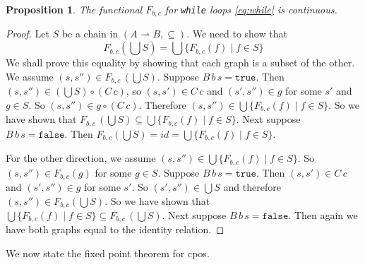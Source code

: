 \documentclass{tufte-handout}
\newcommand{\TRUE}[0]{\mathtt{true}}
\newcommand{\FALSE}[0]{\mathtt{false}}
\newtheorem{proposition}[theorem]{Proposition}
\begin{document}
\begin{proposition}
  The functional $F_{b,c}$ for \texttt{while} loops \eqref{eq:while}
  is continuous.
\end{proposition}
\begin{proof}
  Let $S$ be a chain in $(A\rightharpoonup B,\subseteq)$. 
  We need to show that
  \[
  F_{b,c}(\bigcup S) = \bigcup \{ F_{b,c}(f) \mid f \in S\}
  \]
  We shall prove this equality by showing that each graph is a subset
  of the other.  We assume $(s,s'') \in F_{b,c}\,(\bigcup S)$.
  Suppose $B\,b\,s = \TRUE$.  Then $(s,s'') \in (\bigcup S) \circ (C
  \, c)$, so $(s,s') \in C\,c$ and $(s',s'') \in g$ for some $s'$ and
  $g \in S$. So $(s,s'') \in g \circ (C\, c)$.  Therefore $(s,s'') \in
  \bigcup \{ F_{b,c}(f) \mid f \in S \}$.  So we have shown that
  $F_{b,c}\,(\bigcup S) \subseteq \bigcup \{ F_{b,c}(f) \mid f \in S
  \}$. Next suppose $B\,b\,s = \FALSE$.  Then
  $
  F_{b,c}(\bigcup S) = \mathit{id} = \bigcup \{ F_{b,c}(f) \mid f \in S\}
  $.

  For the other direction, we assume $(s,s'') \in \bigcup \{
  F_{b,c}(f) \mid f \in S\}$. So $(s,s'') \in F_{b,c}(g)$ for some $g
  \in S$.  Suppose $B\,b\,s = \TRUE$.  Then $(s,s') \in C\,c$ and
  $(s',s'') \in g$ for some $s'$. So $(s',s'') \in \bigcup S$ and
  therefore $(s,s'') \in F_{b,c}(\bigcup S)$.  So we have shown that
  $\bigcup \{ F_{b,c}(f) \mid f \in S \} \subseteq F_{b,c}\,(\bigcup
  S)$. Next suppose $B\,b\,s = \FALSE$. Then again we have both graphs
  equal to the identity relation.
\end{proof}

We now state the fixed point theorem for cpos.
\end{document}
